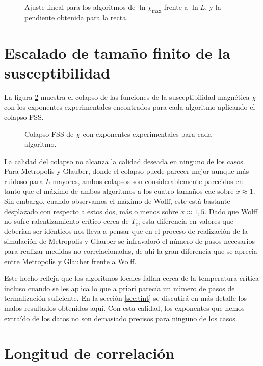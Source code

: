\begin{figure}
  \centering
  
  \caption{Ajuste lineal para los algoritmos de $\ln{\chi_{\max}}$ frente a $\ln{L}$, y la pendiente obtenida para la recta.}
  \label{fig:chi_scaling}
\end{figure}

\section{Escalado de tamaño finito de la susceptibilidad}

La figura \ref{fig:fss_suscept} muestra el colapso de las funciones de la susceptibilidad magnética $\chi$ con los exponentes experimentales encontrados para cada algoritmo aplicando el colapso FSS.

\begin{figure}
  \centering
  
  \caption{Colapso FSS de $\chi$ con exponentes experimentales para cada algoritmo.}
  \label{fig:fss_suscept}
\end{figure}

La calidad del colapso no alcanza la calidad deseada en ninguno de los casos. Para Metropolis y Glauber, donde el colapso puede parecer mejor aunque más ruidoso para $L$ mayores, ambos colapsos son considerablemente parecidos en tanto que el máximo de ambos algoritmos a los cuatro tamaños cae sobre $x\approx1$. Sin embargo, cuando observamos el máximo de Wolff, este está bastante desplazado con respecto a estos dos, más o menos sobre $x\approx 1,5$. Dado que Wolff no sufre ralentizamiento crítico cerca de $T_c$, esta diferencia en valores que deberían ser idénticos nos lleva a pensar que en el proceso de realización de la simulación de Metropolis y Glauber se infravaloró el número de pasos necesarios para realizar medidas no correlacionadas, de ahí la gran diferencia que se aprecia entre Metropolis y Glauber frente a Wolff.

Este hecho refleja que los algoritmos locales fallan cerca de la temperatura crítica incluso cuando se les aplica lo que a priori parecía un número de pasos de termalización suficiente. En la sección \ref{sec:tint} se discutirá en más detalle los malos resultados obtenidos aquí. Con esta calidad, los exponentes que hemos extraído de los datos no son demasiado precisos para ninguno de los casos.

\section{Longitud de correlación}

